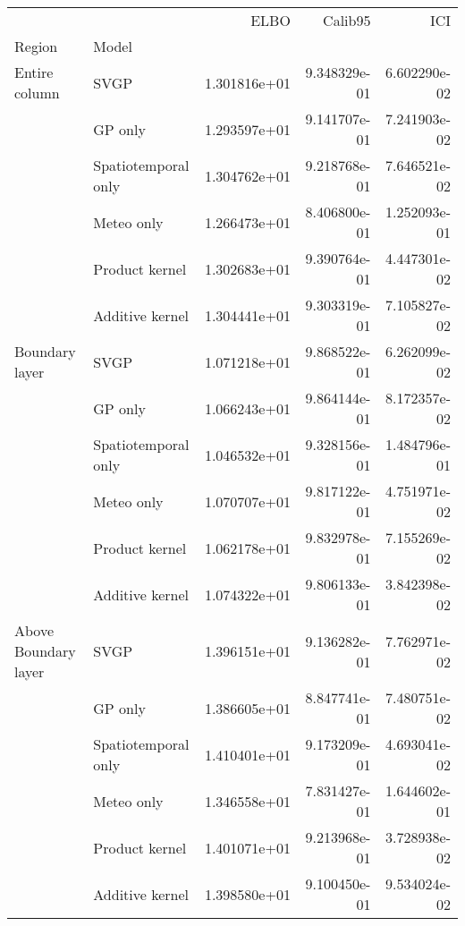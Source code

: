 \begin{tabular}{llrrr}
\toprule
                     &                 &         ELBO &      Calib95 &          ICI \\
Region & Model &              &              &              \\
\midrule
Entire column & SVGP & 1.301816e+01 & 9.348329e-01 & 6.602290e-02 \\
                     & GP only & 1.293597e+01 & 9.141707e-01 & 7.241903e-02 \\
                     & Spatiotemporal only & 1.304762e+01 & 9.218768e-01 & 7.646521e-02 \\
                     & Meteo only & 1.266473e+01 & 8.406800e-01 & 1.252093e-01 \\
                     & Product kernel & 1.302683e+01 & 9.390764e-01 & 4.447301e-02 \\
                     & Additive kernel & 1.304441e+01 & 9.303319e-01 & 7.105827e-02 \\
Boundary layer & SVGP & 1.071218e+01 & 9.868522e-01 & 6.262099e-02 \\
                     & GP only & 1.066243e+01 & 9.864144e-01 & 8.172357e-02 \\
                     & Spatiotemporal only & 1.046532e+01 & 9.328156e-01 & 1.484796e-01 \\
                     & Meteo only & 1.070707e+01 & 9.817122e-01 & 4.751971e-02 \\
                     & Product kernel & 1.062178e+01 & 9.832978e-01 & 7.155269e-02 \\
                     & Additive kernel & 1.074322e+01 & 9.806133e-01 & 3.842398e-02 \\
Above Boundary layer & SVGP & 1.396151e+01 & 9.136282e-01 & 7.762971e-02 \\
                     & GP only & 1.386605e+01 & 8.847741e-01 & 7.480751e-02 \\
                     & Spatiotemporal only & 1.410401e+01 & 9.173209e-01 & 4.693041e-02 \\
                     & Meteo only & 1.346558e+01 & 7.831427e-01 & 1.644602e-01 \\
                     & Product kernel & 1.401071e+01 & 9.213968e-01 & 3.728938e-02 \\
                     & Additive kernel & 1.398580e+01 & 9.100450e-01 & 9.534024e-02 \\
\bottomrule
\end{tabular}
